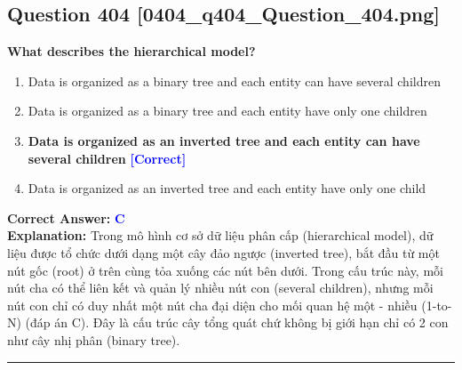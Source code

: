 \documentclass[11pt,a4paper]{article}
\begin{document}
\begin{minipage}{\textwidth}
\subsection*{Question 404 \quad \footnotesize{[0404\_q404\_Question\_404.png]}}
\noindent \textbf{What describes the hierarchical model?}

\begin{enumerate}[label=\Alph*.]
    \item Data is organized as a binary tree and each entity can have several children
    \item Data is organized as a binary tree and each entity have only one children
    \item \textbf{Data is organized as an inverted tree and each entity can have several children} \hfill \textcolor{blue}{\textbf{[Correct]}}
    \item Data is organized as an inverted tree and each entity have only one child
\end{enumerate}

\noindent \textbf{Correct Answer:} \textcolor{blue}{\textbf{C}} \\[2pt]
\noindent \textbf{Explanation:} Trong mô hình cơ sở dữ liệu phân cấp (hierarchical model), dữ liệu được tổ chức dưới dạng một cây đảo ngược (inverted tree), bắt đầu từ một nút gốc (root) ở trên cùng tỏa xuống các nút bên dưới. Trong cấu trúc này, mỗi nút cha có thể liên kết và quản lý nhiều nút con (several children), nhưng mỗi nút con chỉ có duy nhất một nút cha đại diện cho mối quan hệ một - nhiều (1-to-N) (đáp án C). Đây là cấu trúc cây tổng quát chứ không bị giới hạn chỉ có 2 con như cây nhị phân (binary tree).

\par\vspace{0.3cm}
\hrule
\vspace{0.3cm}
\end{minipage}
\end{document}
